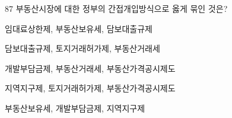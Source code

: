 \begin{question}{87}
부동산시장에 대한 정부의 간접개입방식으로 옳게 묶인 것은?
\begin{choices}
  \item 임대료상한제, 부동산보유세, 담보대출규제
  \item 담보대출규제, 토지거래허가제, 부동산거래세
  \item 개발부담금제, 부동산거래세, 부동산가격공시제도
  \item 지역지구제, 토지거래허가제, 부동산가격공시제도
  \item 부동산보유세, 개발부담금제, 지역지구제
\end{choices}
\end{question}
